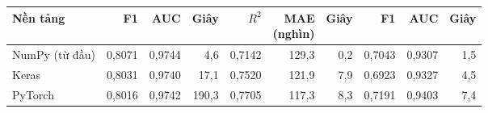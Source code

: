 \begin{tabular}{lrrrrrrrrr}
\toprule
Nền tảng & F1 & AUC & Giây & $R^2$ & \makecell[r]{MAE\\(nghìn)} & Giây & F1 & AUC & Giây \\
\midrule
NumPy (từ đầu) & 0{,}8071 & 0{,}9744 & 4{,}6 & 0{,}7142 & 129{,}3 & 0{,}2 & 0{,}7043 & 0{,}9307 & 1{,}5 \\
Keras & 0{,}8031 & 0{,}9740 & 17{,}1 & 0{,}7520 & 121{,}9 & 7{,}9 & 0{,}6923 & 0{,}9327 & 4{,}5 \\
PyTorch & 0{,}8016 & 0{,}9742 & 190{,}3 & 0{,}7705 & 117{,}3 & 8{,}3 & 0{,}7191 & 0{,}9403 & 7{,}4 \\
\bottomrule
\end{tabular}
